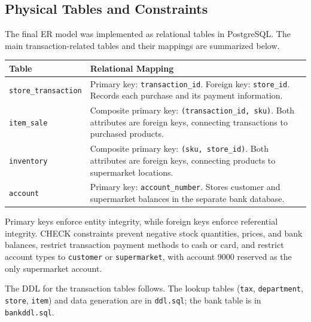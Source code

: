 \documentclass[11pt,letterpaper]{article}
\begin{document}
\subsection{Physical Tables and Constraints}

The final ER model was implemented as relational tables in PostgreSQL. The main transaction-related tables and their mappings are summarized below.

\begin{center}
\small
\begin{tabularx}{\textwidth}{@{}p{}X@{}}
\hline
Table & Relational Mapping \\ \hline

\texttt{store\_transaction} &
Primary key: \texttt{transaction\_id}.
Foreign key: \texttt{store\_id}.
Records each purchase and its payment information. \\

\texttt{item\_sale} &
Composite primary key: \texttt{(transaction\_id, sku)}.
Both attributes are foreign keys, connecting transactions to purchased products. \\

\texttt{inventory} &
Composite primary key: \texttt{(sku, store\_id)}.
Both attributes are foreign keys, connecting products to supermarket locations. \\

\texttt{account} &
Primary key: \texttt{account\_number}.
Stores customer and supermarket balances in the separate bank database. \\ \hline

\end{tabularx}
\end{center}

Primary keys enforce entity integrity, while foreign keys enforce referential integrity. CHECK constraints prevent negative stock quantities, prices, and bank balances, restrict transaction payment methods to cash or card, and restrict account types to \texttt{customer} or \texttt{supermarket}, with account 9000 reserved as the only supermarket account.

The DDL for the transaction tables follows. The lookup tables (\texttt{tax}, \texttt{department}, \texttt{store}, \texttt{item}) and data generation are in \texttt{ddl.sql}; the bank table is in \texttt{bankddl.sql}.
\end{document}
